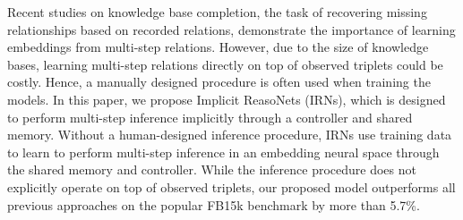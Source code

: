 Recent studies on knowledge base completion, the task of recovering missing relationships based on recorded relations, demonstrate the importance of learning embeddings from multi-step relations. However, due to the size of knowledge bases, learning multi-step relations directly on top of observed triplets could be costly. Hence, a manually designed procedure is often used when training the models. In this paper, we propose Implicit ReasoNets (IRNs), which is designed to perform multi-step inference implicitly through a controller and shared memory. Without a human-designed inference procedure, IRNs use training data to learn to perform multi-step inference in an embedding neural space through the shared memory and controller. While the inference procedure does not explicitly operate on top of observed triplets, our proposed model outperforms all previous approaches on the popular FB15k benchmark by more than 5.7\%.

